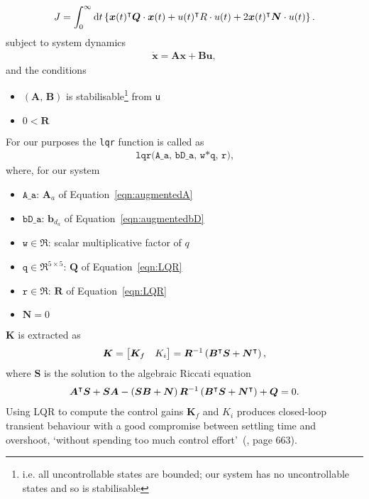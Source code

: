 \begin{align}
J = \int_0^\infty \mathrm{d}t\left\{\boldsymbol{x}(t)^\intercal \boldsymbol{Q} \cdot \boldsymbol{x}(t)
+ u(t)^\intercal R \cdot u(t)
+ 2 \boldsymbol{x}(t)^\intercal \boldsymbol{N} \cdot u(t)\right\}.
\label{eqn:LQR2}
\end{align}
subject to system dynamics
\begin{align*}
\boldsymbol{\dot{x}} = \boldsymbol{A}\boldsymbol{x} + \boldsymbol{B}\boldsymbol{u},
\end{align*}
and the conditions
\begin{itemize}
    \item $(\boldsymbol{A}, \, \boldsymbol{B})$ is stabilisable\footnote{i.e. all uncontrollable states are bounded; our system has no uncontrollable states and so is stabilisable} from \texttt{u}
    \item $0 < \boldsymbol{R}$
\end{itemize}
For our purposes the \texttt{lqr} function is called as
\begin{align*}
\texttt{lqr(A\_a, bD\_a, w*q, r)},
\end{align*}
where, for our system
\begin{itemize}
	\item $\texttt{A\_a}$: $\boldsymbol{A}_a$ of Equation~\ref{eqn:augmentedA}
	\item $\texttt{bD\_a}$: $\boldsymbol{b}_{d_a}$ of Equation~\ref{eqn:augmentedbD}
	\item $\texttt{w} \in \Re$: scalar multiplicative factor of $q$
	\item $\texttt{q}\in \Re^{5 \times 5}$: $\boldsymbol{Q}$ of Equation~\ref{eqn:LQR}
	\item $\texttt{r} \in \Re$: $\boldsymbol{R}$ of Equation~\ref{eqn:LQR}
	\item $\boldsymbol{N} = 0$
\end{itemize}
$\boldsymbol{K}$ is extracted as
\begin{align*}
\boldsymbol{K}
=
\begin{bmatrix}
\boldsymbol{K}_f & K_i
\end{bmatrix}
=
\boldsymbol{R}^{{-} 1} \left(\boldsymbol{B}^\intercal \boldsymbol{S} + \boldsymbol{N}^\intercal\right),
\end{align*}
where $\boldsymbol{S}$ is the solution to the algebraic Riccati equation
\begin{align*}
\boldsymbol{A}^\intercal \boldsymbol{S} + \boldsymbol{S}\boldsymbol{A} - \left(\boldsymbol{S}\boldsymbol{B} + \boldsymbol{N}\right)\boldsymbol{R}^{{-} 1} \left(\boldsymbol{B}^\intercal \boldsymbol{S} + \boldsymbol{N}^\intercal\right) + \boldsymbol{Q} = 0.
\end{align*}
Using LQR to compute the control gains $\boldsymbol{K}_f$ and $K_i$ produces closed-loop transient behaviour with a good compromise between settling time and overshoot, `without spending too much control effort'~(\cite{controlsystemdesign}, page 663).
